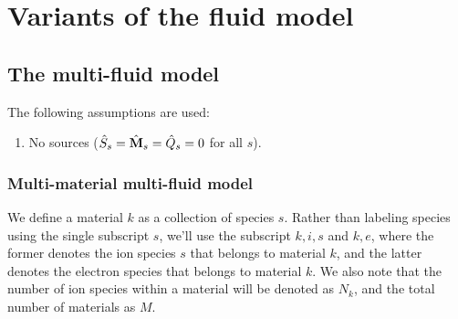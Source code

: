 \documentclass[a4paper,11pt]{report}
\begin{document}
\chapter{Variants of the fluid model}

\section{The multi-fluid model}
The following assumptions are used:
\begin{enumerate}
    \item No sources ($\hat{S}_s = \hat{\mathbf{M}}_s = \hat{Q}_s = 0$ for all $s$).
\end{enumerate}

\subsection{Multi-material multi-fluid model}
We define a material $k$ as a collection of species $s$. Rather than labeling species using the single subscript $s$, we'll use the subscript $k,i,s$ and $k,e$, where the former denotes the ion species $s$ that belongs to material $k$, and the latter denotes the electron species that belongs to material $k$. We also note that the number of ion species within a material will be denoted as $N_k$, and the total number of materials as $M$.
\end{document}
